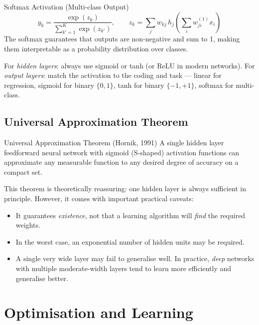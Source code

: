 \documentclass[11pt,a4paper]{article}
\begin{document}
\begin{defbox}{Softmax Activation (Multi-class Output)}
\[
y_k = \frac{\exp(z_k)}{\sum_{k'=1}^{K} \exp(z_{k'})},
\qquad z_k = \sum_j w_{kj}\, h_j\!\left(\sum_i w_{ji}^{(1)} x_i\right)
\]
The softmax guarantees that outputs are non-negative and sum to 1, making them interpretable as a probability distribution over classes.
\end{defbox}

\begin{warnbox}
For \emph{hidden layers}: always use sigmoid or tanh (or ReLU in modern networks). For \emph{output layers}: match the activation to the coding and task — linear for regression, sigmoid for binary $\{0,1\}$, tanh for binary $\{-1,+1\}$, softmax for multi-class.
\end{warnbox}

\subsection{Universal Approximation Theorem}

\begin{thmbox}{Universal Approximation Theorem (Hornik, 1991)}
A single hidden layer feedforward neural network with sigmoid (S-shaped) activation functions can approximate any measurable function to any desired degree of accuracy on a compact set.
\end{thmbox}

This theorem is theoretically reassuring: one hidden layer is always sufficient in principle. However, it comes with important practical caveats:
\begin{itemize}
  \item It guarantees \emph{existence}, not that a learning algorithm will \emph{find} the required weights.
  \item In the worst case, an exponential number of hidden units may be required.
  \item A single very wide layer may fail to generalise well. In practice, \emph{deep} networks with multiple moderate-width layers tend to learn more efficiently and generalise better.
\end{itemize}

\section{Optimisation and Learning}
\end{document}
